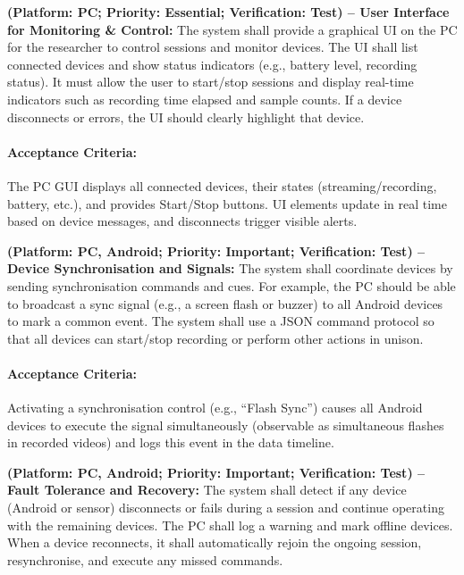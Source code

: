 \begin{description}[style=unboxed,leftmargin=0cm]
    \item[\textbf{FR6}] \textbf{(Platform: PC; Priority: Essential; Verification: Test) – User Interface for Monitoring \& Control:} The system shall provide a graphical UI on the PC for the researcher to control sessions and monitor devices. The UI shall list connected devices and show status indicators (e.g., battery level, recording status). It must allow the user to start/stop sessions and display real-time indicators such as recording time elapsed and sample counts. If a device disconnects or errors, the UI should clearly highlight that device.

    \paragraph{Acceptance Criteria:} The PC GUI displays all connected devices, their states (streaming/recording, battery, etc.), and provides Start/Stop buttons. UI elements update in real time based on device messages, and disconnects trigger visible alerts.

    \item[\textbf{FR7}] \textbf{(Platform: PC, Android; Priority: Important; Verification: Test) – Device Synchronisation and Signals:} The system shall coordinate devices by sending synchronisation commands and cues. For example, the PC should be able to broadcast a sync signal (e.g., a screen flash or buzzer) to all Android devices to mark a common event. The system shall use a JSON command protocol so that all devices can start/stop recording or perform other actions in unison.

    \paragraph{Acceptance Criteria:} Activating a synchronisation control (e.g., “Flash Sync”) causes all Android devices to execute the signal simultaneously (observable as simultaneous flashes in recorded videos) and logs this event in the data timeline.

    \item[\textbf{FR8}] \textbf{(Platform: PC, Android; Priority: Important; Verification: Test) – Fault Tolerance and Recovery:} The system shall detect if any device (Android or sensor) disconnects or fails during a session and continue operating with the remaining devices. The PC shall log a warning and mark offline devices. When a device reconnects, it shall automatically rejoin the ongoing session, resynchronise, and execute any missed commands.


\end{description}
